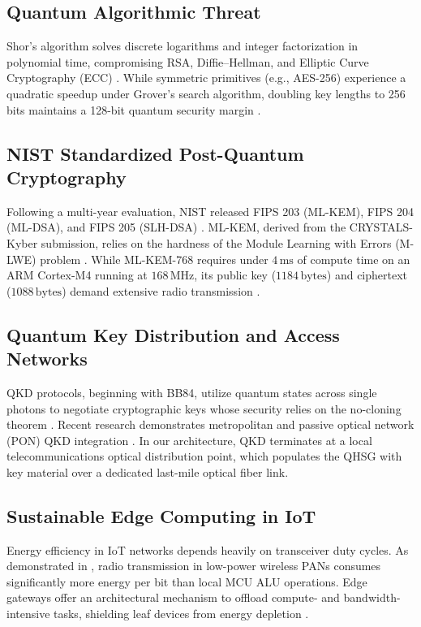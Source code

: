 \documentclass[journal]{IEEEtran}
\begin{document}
\subsection{Quantum Algorithmic Threat}
Shor's algorithm solves discrete logarithms and integer factorization in polynomial time,
compromising RSA, Diffie--Hellman, and Elliptic Curve Cryptography (ECC) \cite{shor}. While
symmetric primitives (e.g., AES-256) experience a quadratic speedup under Grover's search
algorithm, doubling key lengths to 256 bits maintains a 128-bit quantum security margin
\cite{grover1996fast,bernstein2017post}.

\subsection{NIST Standardized Post-Quantum Cryptography}
Following a multi-year evaluation, NIST released FIPS 203 (ML-KEM), FIPS 204 (ML-DSA), and
FIPS 205 (SLH-DSA) \cite{nist203,nist204,nist205}. ML-KEM, derived from the CRYSTALS-Kyber
submission, relies on the hardness of the Module Learning with Errors (M-LWE) problem
\cite{alkim2016kyber,bos2018crystals}. While ML-KEM-768 requires under $4\,\text{ms}$ of
compute time on an ARM Cortex-M4 running at $168\,\text{MHz}$, its public key ($1184\,\text{bytes}$)
and ciphertext ($1088\,\text{bytes}$) demand extensive radio transmission \cite{kannwischer2020pqm4}.

\subsection{Quantum Key Distribution and Access Networks}
QKD protocols, beginning with BB84, utilize quantum states across single photons to negotiate
cryptographic keys whose security relies on the no-cloning theorem \cite{bb84,scarani,pirandola}.
Recent research demonstrates metropolitan and passive optical network (PON) QKD integration
\cite{frohlich2013quantum,cao2022quantum}. In our architecture, QKD terminates at a local
telecommunications optical distribution point, which populates the QHSG with key material
over a dedicated last-mile optical fiber link.

\subsection{Sustainable Edge Computing in IoT}
Energy efficiency in IoT networks depends heavily on transceiver duty cycles. As demonstrated
in \cite{gungor2021sustainable,marcu2020lifecycle}, radio transmission in low-power wireless
PANs consumes significantly more energy per bit than local MCU ALU operations. Edge gateways
offer an architectural mechanism to offload compute- and bandwidth-intensive tasks, shielding
leaf devices from energy depletion \cite{satyanarayanan2017emergence,khan2020energy}.
\end{document}
